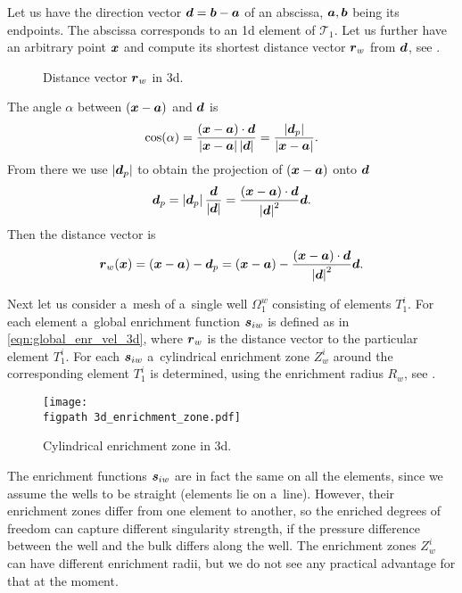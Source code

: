 Let us have the direction vector $\mathbf{\boldsymbol{d}} = \mathbf{\boldsymbol{b}} - \mathbf{\boldsymbol{a}}$ of an abscissa, $\mathbf{\boldsymbol{a}}, \mathbf{\boldsymbol{b}}$ being its endpoints. 
The abscissa corresponds to an 1d element of $\mathcal{T}_1$.
Let us further have an arbitrary point $\mathbf{\boldsymbol{x}}$ and compute its 
shortest distance vector $\mathbf{\boldsymbol{r}}_w$ from $\mathbf{\boldsymbol{d}}$, see .
%
\begin{figure}[!htb]
  \vspace{5pt}
  \centering
  \def\svgwidth{0.5\textwidth}
  
  \caption{Distance vector $\mathbf{\boldsymbol{r}}_w$ in 3d.}
  \label{fig:distance_vector_3d}
\end{figure}
%
The angle $\alpha$ between $(\mathbf{\boldsymbol{x}} - \mathbf{\boldsymbol{a}})$ and $\mathbf{\boldsymbol{d}}$ is 
\[
\cos(\alpha) = \frac{(\mathbf{\boldsymbol{x}} - \mathbf{\boldsymbol{a}})\cdot\mathbf{\boldsymbol{d}}}{\left|\mathbf{\boldsymbol{x}} - \mathbf{\boldsymbol{a}}\right|\left|\mathbf{\boldsymbol{d}}\right|} = \frac{\left|\mathbf{\boldsymbol{d}}_p\right|}{\left|\mathbf{\boldsymbol{x}} - \mathbf{\boldsymbol{a}}\right|}.
\]
From there we use $\left|\mathbf{\boldsymbol{d}}_p\right|$ to obtain the projection of $(\mathbf{\boldsymbol{x}}-\mathbf{\boldsymbol{a}})$ onto $\mathbf{\boldsymbol{d}}$
\[
\mathbf{\boldsymbol{d}}_p = \left|\mathbf{\boldsymbol{d}}_p\right|\frac{\mathbf{\boldsymbol{d}}}{\left|\mathbf{\boldsymbol{d}}\right|} = \frac{(\mathbf{\boldsymbol{x}} - \mathbf{\boldsymbol{a}})\cdot\mathbf{\boldsymbol{d}}}{\left|\mathbf{\boldsymbol{d}}\right|^2} \mathbf{\boldsymbol{d}}.
\]
Then the distance vector is
\begin{equation} \label{eqn:distance_vector_in_3d}
  \mathbf{\boldsymbol{r}}_w(\mathbf{\boldsymbol{x}}) = (\mathbf{\boldsymbol{x}} - \mathbf{\boldsymbol{a}}) - \mathbf{\boldsymbol{d}}_p = (\mathbf{\boldsymbol{x}} - \mathbf{\boldsymbol{a}}) - \frac{(\mathbf{\boldsymbol{x}} - \mathbf{\boldsymbol{a}})\cdot\mathbf{\boldsymbol{d}}}{\left|\mathbf{\boldsymbol{d}}\right|^2} \mathbf{\boldsymbol{d}}.
\end{equation}

Next let us consider a~mesh of a~single well $\Omega^w_1$ consisting of elements $T^i_1$.
For each element a~global enrichment function $\mathbf{\boldsymbol{s}}_{iw}$ is defined as in \eqref{eqn:global_enr_vel_3d},
where $\mathbf{\boldsymbol{r}}_w$ is the distance vector to the particular element $T^i_1$.
For each $\mathbf{\boldsymbol{s}}_{iw}$ a~cylindrical enrichment zone $Z^i_w$ around the corresponding element $T^i_1$ is determined, 
using the enrichment radius $R_w$, see .
%
\begin{figure}[!htb]
    \centering    
    \texttt{[image: \\figpath 3d\_enrichment\_zone.pdf]} 
    \caption{Cylindrical enrichment zone in 3d.}
  \label{fig:enrichment_zone_in_3d}
\end{figure}
%
The enrichment functions $\mathbf{\boldsymbol{s}}_{iw}$ are in fact the same on all the elements,
since we assume the wells to be straight (elements lie on a~line). However, their enrichment zones differ from one element to another,
so the enriched degrees of freedom can capture different singularity strength, if the pressure difference between
the well and the bulk differs along the well.
The enrichment zones $Z^i_w$ can have different enrichment radii, but we do not see any practical advantage for that at the moment.

